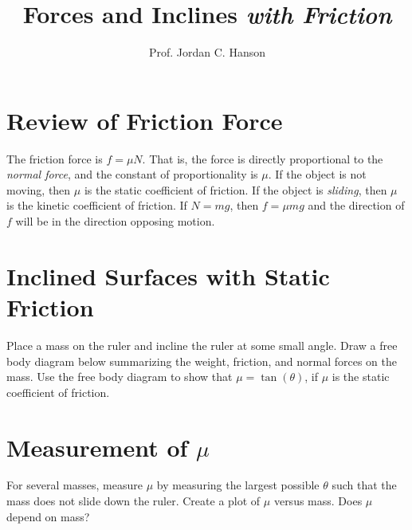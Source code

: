 \documentclass{article}
\begin{document}
\title{Forces and Inclines \textit{with Friction}}
\author{Prof. Jordan C. Hanson}

\maketitle

\section{Review of Friction Force}
The friction force is $f = \mu N$.  That is, the force is directly proportional to the \textit{normal force}, and the constant of proportionality is $\mu$. If the object is not moving, then $\mu$ is the static coefficient of friction.  If the object is \textit{sliding}, then $\mu$ is the kinetic coefficient of friction.  If $N = mg$, then $f = \mu m g$ and the direction of $f$ will be in the direction opposing motion.
\section{Inclined Surfaces with Static Friction}
Place a mass on the ruler and incline the ruler at some small angle.  Draw a free body diagram below summarizing the weight, friction, and normal forces on the mass.  Use the free body diagram to show that $\mu = \tan(\theta)$, if $\mu$ is the static coefficient of friction. \\ \vspace{3cm}
\section{Measurement of $\mu$}
For several masses, measure $\mu$ by measuring the largest possible $\theta$ such that the mass does not slide down the ruler.  Create a plot of $\mu$ versus mass.  Does $\mu$ depend on mass?
\end{document}
